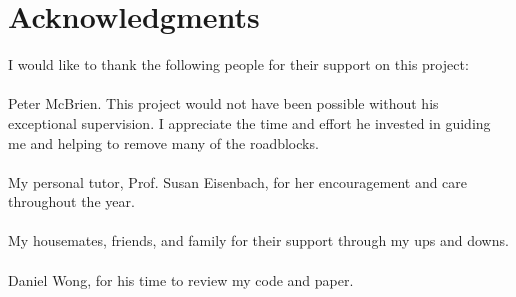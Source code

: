 \cleardoublepage
{}
{}
\chapter*{Acknowledgments}
\vspace{1.0in}
I would like to thank the following people for their support on this project:\\
\\
Peter McBrien. This project would not have been possible without his exceptional supervision. I appreciate the time and effort he invested in guiding me and helping to remove many of the roadblocks.\\
\\
My personal tutor, Prof. Susan Eisenbach, for her encouragement and care throughout the year.\\
\\
My housemates, friends, and family for their support through my ups and downs. \\
\\
Daniel Wong, for his time to review my code and paper.\\
\\
\\
\\
\\
\\
\newpage
